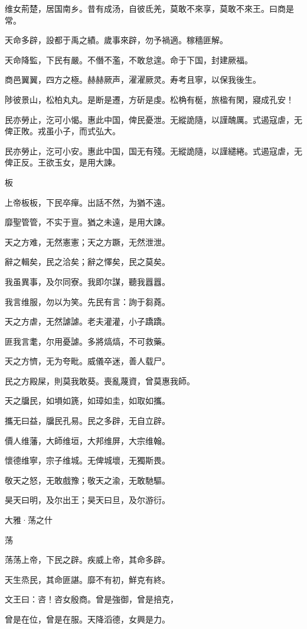 维女荊楚，居国南乡。昔有成汤，自彼氐羌，莫敢不來享，莫敢不來王。曰商是常。

天命多辟，設都于禹之績。歲事來辟，勿予禍適。稼穡匪解。

天命降監，下民有嚴。不僭不濫，不敢怠遑。命于下国，封建厥福。

商邑翼翼，四方之極。赫赫厥声，濯濯厥灵。寿考且寧，以保我後生。

陟彼景山，松柏丸丸。是断是遷，方斫是虔。松桷有梴，旅楹有閑，寢成孔安！

民亦勞止，汔可小愒。惠此中国，俾民憂泄。无縱詭隨，以謹醜厲。式遏寇虐，无俾正敗。戎虽小子，而式弘大。

民亦勞止，汔可小安。惠此中国，国无有殘。无縱詭隨，以謹繾綣。式遏寇虐，无俾正反。王欲玉女，是用大諫。

板

上帝板板，下民卒癉。出話不然，为猶不遠。

靡聖管管，不实于亶。猶之未遠，是用大諫。

天之方难，无然憲憲；天之方蹶，无然泄泄。

辭之輯矣，民之洽矣；辭之懌矣，民之莫矣。

我虽異事，及尔同寮。我即尔謀，聽我囂囂。

我言维服，勿以为笑。先民有言：詢于芻蕘。

天之方虐，无然謔謔。老夫灌灌，小子蹻蹻。

匪我言耄，尔用憂謔。多將熇熇，不可救藥。

天之方懠，无为夸毗。威儀卒迷，善人载尸。

民之方殿屎，則莫我敢葵。喪亂蔑資，曾莫惠我師。

天之牖民，如塤如篪，如璋如圭，如取如攜。

攜无曰益，牖民孔易。民之多辟，无自立辟。

價人维藩，大師维垣，大邦维屏，大宗维翰。

懷德维寧，宗子维城。无俾城壞，无獨斯畏。

敬天之怒，无敢戲豫；敬天之渝，无敢馳驅。

昊天曰明，及尔出王；昊天曰旦，及尔游衍。




大雅·荡之什


荡

荡荡上帝，下民之辟。疾威上帝，其命多辟。

天生烝民，其命匪諶。靡不有初，鮮克有終。

文王曰：咨！咨女殷商。曾是強御，曾是掊克，

曾是在位，曾是在服。天降滔德，女興是力。

